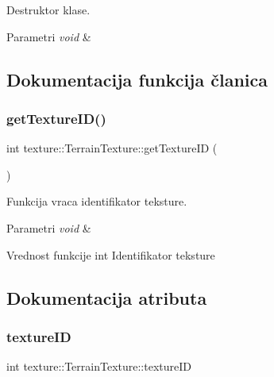 Destruktor klase. 


\begin{DoxyParams}{Parametri}
{\em void} & \\
\hline
\end{DoxyParams}


\subsection{Dokumentacija funkcija članica}
\mbox{\label{classtexture_1_1TerrainTexture_a01ad68289523fa583d2892cf44d39b23}} 
\subsubsection{\texorpdfstring{get\+Texture\+I\+D()}{getTextureID()}}
{\footnotesize\ttfamily int texture\+::\+Terrain\+Texture\+::get\+Texture\+ID (\begin{DoxyParamCaption}{ }\end{DoxyParamCaption})}



Funkcija vraca identifikator teksture. 


\begin{DoxyParams}{Parametri}
{\em void} & \\
\hline
\end{DoxyParams}
\begin{DoxyReturn}{Vrednost funkcije}
int Identifikator teksture 
\end{DoxyReturn}


\subsection{Dokumentacija atributa}
\mbox{\label{classtexture_1_1TerrainTexture_a52da27a891185b2df83c4e1c62fde3c6}} 
\subsubsection{\texorpdfstring{texture\+ID}{textureID}}
{\footnotesize\ttfamily int texture\+::\+Terrain\+Texture\+::texture\+ID\hspace{0.3cm}{\ttfamily [private]}}



